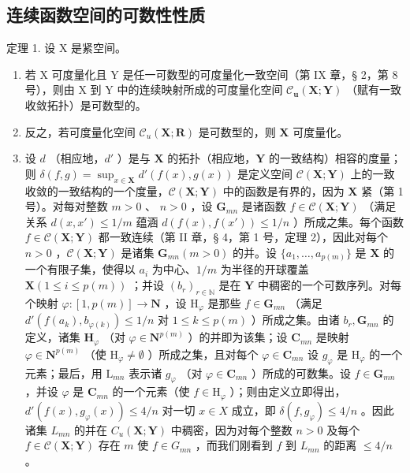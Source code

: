 \subsection{连续函数空间的可数性性质}

定理 1. 设 X 是紧空间。

\begin{enumerate}
\def\labelenumi{\alph{enumi})}
\item
  若 X 可度量化且 Y 是任一可数型的可度量化一致空间（第 IX 章，§ 2，第 8 号），则由 X 到 Y 中的连续映射所成的可度量化空间 \(\mathcal{C}_{\mathbf{u}}(\mathbf{X};\mathbf{Y})\) （赋有一致收敛拓扑）是可数型的。
\item
  反之，若可度量化空间 \(\mathcal{C}_{u}(\mathbf{X};\mathbf{R})\) 是可数型的，则 \(\mathbf{X}\) 可度量化。
\item
  设 \(d\) （相应地，\(d'\) ）是与 \(\mathbf{X}\) 的拓扑（相应地，\(\mathbf{Y}\) 的一致结构）相容的度量；则 \(\delta(f, g) = \sup_{x \in \mathbf{X}} d'(f(x), g(x))\) 是定义空间 \(\mathcal{C}(\mathbf{X}; \mathbf{Y})\) 上的一致收敛的一致结构的一个度量，\(\mathcal{C}(\mathbf{X}; \mathbf{Y})\) 中的函数是有界的，因为 \(\mathbf{X}\) 紧（第 1 号）。对每对整数 \(m > 0\) 、 \(n > 0\) ，设 \(\mathbf{G}_{mn}\) 是诸函数 \(f \in \mathcal{C}(\mathbf{X};\mathbf{Y})\) （满足关系 \(d(x,x') \leqslant 1 / m\) 蕴涵 \(d(f(x),f(x')) \leqslant 1 / n\) ）所成之集。每个函数 \(f \in \mathcal{C}(\mathbf{X};\mathbf{Y})\) 都一致连续（第 II 章，§ 4，第 1 号，定理 2），因此对每个 \(n > 0\) ，\(\mathcal{C}(\mathbf{X};\mathbf{Y})\) 是诸集 \(\mathbf{G}_{mn}(m > 0)\) 的并。设 \(\{a_1,\dots ,a_{p(m)}\}\) 是 \(\mathbf{X}\) 的一个有限子集，使得以 \(a_i\) 为中心、\(1 / m\) 为半径的开球覆盖 \(\mathbf{X}(1\leqslant i\leqslant p(m))\) ；并设 \((b_r)_{r\in \mathbb{N}}\) 是在 \(\mathbf{Y}\) 中稠密的一个可数序列。对每个映射 \(\varphi :[1,p(m)]\to \mathbf{N}\) ，设 \(\mathrm{H}_{\varphi}\) 是那些 \(f\in \mathbf{G}_{mn}\) （满足 \(d'(f(a_k),b_{\varphi (k)})\leqslant 1 / n\) 对 \(1\leqslant k\leqslant p(m)\) ）所成之集。由诸 \(b_r,\mathbf{G}_{mn}\) 的定义，诸集 \(\mathbf{H}_{\varphi}\) （对 \(\varphi \in \mathbf{N}^{p(m)}\) ）的并即为该集；设 \(\mathbf{C}_{mn}\) 是映射 \(\varphi \in \mathbf{N}^{p(m)}\) （使 \(\mathrm{H}_{\varphi}\neq \emptyset\) ）所成之集，且对每个 \(\varphi \in \mathbf{C}_{mn}\) 设 \(g_{\varphi}\) 是 \(\mathrm{H}_{\varphi}\) 的一个元素；最后，用 \(\mathrm{L}_{mn}\) 表示诸 \(g_{\varphi}\) （对 \(\varphi \in \mathbf{C}_{mn}\) ）所成的可数集。设 \(f\in \mathbf{G}_{mn}\) ，并设 \(\varphi\) 是 \(\mathbf{C}_{mn}\) 的一个元素（使 \(f\in \mathrm{H}_{\varphi}\) ）；则由定义立即得出，\(d'(f(x),g_{\varphi}(x))\leqslant 4 / n\) 对一切 \(x\in X\) 成立，即 \(\delta (f,g_{\varphi})\leqslant 4 / n\) 。因此诸集 \(L_{mn}\) 的并在 \(C_u(\mathbf{X};\mathbf{Y})\) 中稠密，因为对每个整数 \(n > 0\) 及每个 \(f\in \mathcal{C}(\mathbf{X};\mathbf{Y})\) 存在 \(m\) 使 \(f\in G_{mn}\) ，而我们刚看到 \(f\) 到 \(L_{mn}\) 的距离 \(\leqslant 4 / n\) 。

\end{enumerate}
